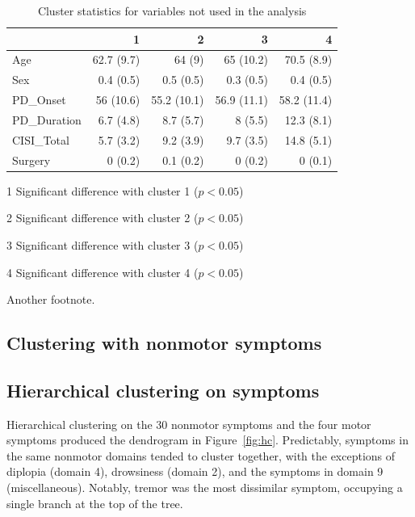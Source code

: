 \documentclass[preprint,3p,twocolumn]{elsarticle} %
\begin{document}
\begin{table}[t]
  \centering
  \caption{Cluster statistics for variables not used in the analysis}
  \label{tab:nmd_extra}
  \begin{threeparttable}
  \begin{tabular}{l r r r r}
    \toprule
    & 1 & 2 & 3 & 4 \\
    \midrule
      Age & 62.7 (9.7) & 64 (9) & 65 (10.2) & 70.5 (8.9) \\
      Sex & 0.4 (0.5) & 0.5 (0.5) & 0.3 (0.5) & 0.4 (0.5) \\
      PD\_Onset & 56 (10.6) & 55.2 (10.1) & 56.9 (11.1) & 58.2 (11.4) \\
      PD\_Duration & 6.7 (4.8) & 8.7 (5.7) & 8 (5.5) & 12.3 (8.1) \\
      CISI\_Total & 5.7 (3.2) & 9.2 (3.9) & 9.7 (3.5) & 14.8 (5.1) \\
      Surgery & 0 (0.2) & 0.1 (0.2) & 0 (0.2) & 0 (0.1) \\
    \bottomrule
  \end{tabular}
  \begin{tablenotes}
    \small
    \item[1] Significant difference with cluster 1 ($p < 0.05$)
    \item[2] Significant difference with cluster 2 ($p < 0.05$)
    \item[3] Significant difference with cluster 3 ($p < 0.05$)
    \item[4] Significant difference with cluster 4 ($p < 0.05$)
    \item[\textdagger] Another footnote.
  \end{tablenotes}
  \end{threeparttable}
\end{table}
\subsection{Clustering with nonmotor symptoms}

\subsection{Hierarchical clustering on symptoms}

Hierarchical clustering on the 30 nonmotor symptoms and the four motor symptoms produced the
dendrogram in Figure~\ref{fig:hc}. Predictably, symptoms in the same nonmotor domains tended to
cluster together, with the exceptions of diplopia (domain 4), drowsiness (domain 2), and the
symptoms in domain 9 (miscellaneous). Notably, tremor was the most dissimilar symptom, occupying a single branch at the
top of the tree.
\end{document}
